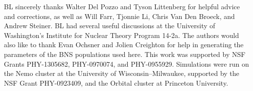 \documentclass[twocolumn,prd,amssymb,aps,nofootinbib,showpacs,epsf]{revtex4}
\begin{document}
\acknowledgements

BL sincerely thanks Walter Del Pozzo and Tyson Littenberg for helpful advice and corrections, as well as Will Farr, Tjonnie Li, Chris Van Den Broeck, and Andrew Steiner. BL had several useful discussions at the University of Washington's Institute for Nuclear Theory Program 14-2a. The authors would also like to thank Evan Ochsner and Jolien Creighton for help in generating the parameters of the BNS populations used here. This work was supported by NSF Grants PHY-1305682, PHY-0970074, and PHY-0955929. Simulations were run on the Nemo cluster at the University of Wisconsin--Milwaukee, supported by the NSF Grant PHY-0923409, and the Orbital cluster at Princeton University.


\end{document}
